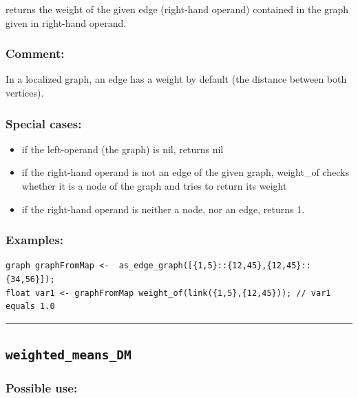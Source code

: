 \documentclass[]{book}
\providecommand{\tightlist}{%
  \setlength{\itemsep}{0pt}\setlength{\parskip}{0pt}}
\theoremstyle{definition}
\theoremstyle{definition}
\theoremstyle{definition}
\theoremstyle{remark}
\begin{document}
returns the weight of the given edge (right-hand operand) contained in
the graph given in right-hand operand.

\subsubsection{Comment:}\label{comment-107}

In a localized graph, an edge has a weight by default (the distance
between both vertices).

\subsubsection{Special cases:}\label{special-cases-144}

\begin{itemize}
\tightlist
\item
  if the left-operand (the graph) is nil, returns nil\\
\item
  if the right-hand operand is not an edge of the given graph,
  weight\_of checks whether it is a node of the graph and tries to
  return its weight\\
\item
  if the right-hand operand is neither a node, nor an edge, returns 1.
\end{itemize}

\subsubsection{Examples:}\label{examples-380}

\begin{verbatim}
graph graphFromMap <-  as_edge_graph([{1,5}::{12,45},{12,45}::{34,56}]);  
float var1 <- graphFromMap weight_of(link({1,5},{12,45})); // var1 equals 1.0
\end{verbatim}

\begin{center}\rule{0.5\linewidth}{\linethickness}\end{center}

\subsection{\texorpdfstring{\texttt{weighted\_means\_DM}}{weighted\_means\_DM}}\label{weighted_means_dm}

\subsubsection{Possible use:}\label{possible-use-554}
\end{document}
